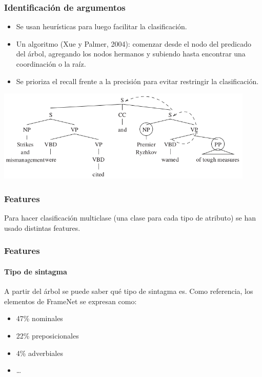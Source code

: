 \documentclass{beamer}
\begin{document}
\begin{frame}[allowframebreaks]
  \frametitle{Identificación de argumentos}

  \begin{itemize}
    \item Se usan heurísticas para luego facilitar la clasificación.

    \item Un algoritmo (Xue y Palmer, 2004): comenzar desde el nodo del predicado del árbol, agregando los nodos hermanos y subiendo hasta encontrar una coordinación o la raíz.

    \item Se prioriza el recall frente a la precisión para evitar restringir la clasificación.
  \end{itemize}

  \framebreak{}

  \includegraphics[height=4.4cm]{identificacion.png}
\end{frame}

\begin{frame}
  \frametitle{Features}

  Para hacer clasificación multiclase (una clase para cada tipo de atributo) se han usado distintas features.

\end{frame}

\begin{frame}
  \frametitle{Features}
  \framesubtitle{Tipo de sintagma}

  A partir del árbol se puede saber qué tipo de sintagma es. Como referencia, los elementos de FrameNet se expresan como:

  \begin{itemize}
    \item 47\% nominales
    \item 22\% preposicionales
    \item 4\% adverbiales
    \item \ldots
  \end{itemize}

\end{frame}
\end{document}
